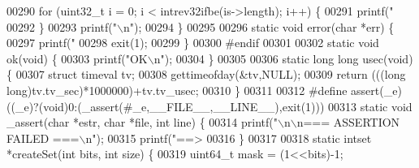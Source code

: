 \begin{DoxyCode}
00290     \textcolor{keywordflow}{for} (uint32\_t i = 0; i < intrev32ifbe(is->length); i++) \{
00291         printf(\textcolor{stringliteral}{"%
00292     \}
00293     printf(\textcolor{stringliteral}{"\(\backslash\)n"});
00294 \}
00295 
00296 \textcolor{keyword}{static} \textcolor{keywordtype}{void} error(\textcolor{keywordtype}{char} *err) \{
00297     printf(\textcolor{stringliteral}{"%
00298     exit(1);
00299 \}
00300 \textcolor{preprocessor}{#}\textcolor{preprocessor}{endif}
00301 
00302 \textcolor{keyword}{static} \textcolor{keywordtype}{void} ok(\textcolor{keywordtype}{void}) \{
00303     printf(\textcolor{stringliteral}{"OK\(\backslash\)n"});
00304 \}
00305 
00306 \textcolor{keyword}{static} \textcolor{keywordtype}{long} \textcolor{keywordtype}{long} usec(\textcolor{keywordtype}{void}) \{
00307     \textcolor{keyword}{struct} timeval tv;
00308     gettimeofday(&tv,NULL);
00309     \textcolor{keywordflow}{return} (((\textcolor{keywordtype}{long} \textcolor{keywordtype}{long})tv.tv\_sec)*1000000)+tv.tv\_usec;
00310 \}
00311 
00312 \textcolor{preprocessor}{#}\textcolor{preprocessor}{define} \textcolor{preprocessor}{assert}\textcolor{preprocessor}{(}\textcolor{preprocessor}{\_e}\textcolor{preprocessor}{)} \textcolor{preprocessor}{(}\textcolor{preprocessor}{(}\textcolor{preprocessor}{\_e}\textcolor{preprocessor}{)}\textcolor{preprocessor}{?}\textcolor{preprocessor}{(}\textcolor{preprocessor}{void}\textcolor{preprocessor}{)}0\textcolor{preprocessor}{:}\textcolor{preprocessor}{(}\textcolor{preprocessor}{\_assert}\textcolor{preprocessor}{(}\textcolor{preprocessor}{#}\textcolor{preprocessor}{\_e}\textcolor{preprocessor}{,}\textcolor{preprocessor}{\_\_FILE\_\_}\textcolor{preprocessor}{,}\textcolor{preprocessor}{\_\_LINE\_\_}\textcolor{preprocessor}{)}\textcolor{preprocessor}{,}\textcolor{preprocessor}{exit}\textcolor{preprocessor}{(}1\textcolor{preprocessor}{)}\textcolor{preprocessor}{)}\textcolor{preprocessor}{)}
00313 \textcolor{keyword}{static} \textcolor{keywordtype}{void} \_assert(\textcolor{keywordtype}{char} *estr, \textcolor{keywordtype}{char} *file, \textcolor{keywordtype}{int} line) \{
00314     printf(\textcolor{stringliteral}{"\(\backslash\)n\(\backslash\)n=== ASSERTION FAILED ===\(\backslash\)n"});
00315     printf(\textcolor{stringliteral}{"==> %
00316 \}
00317 
00318 \textcolor{keyword}{static} intset *createSet(\textcolor{keywordtype}{int} bits, \textcolor{keywordtype}{int} size) \{
00319     uint64\_t mask = (1<<bits)-1;
}}}
\end{DoxyCode}
